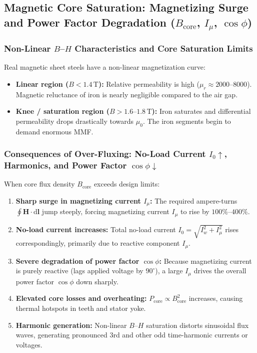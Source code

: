 \subsection{Magnetic Core Saturation: Magnetizing Surge and Power Factor Degradation ($B_{\mathrm{core}}$, $I_\mu$, $\cos\phi$)}

\subsubsection{Non-Linear $B$--$H$ Characteristics and Core Saturation Limits}
Real magnetic sheet steels have a non-linear magnetization curve:
\begin{itemize}
  \item \textbf{Linear region ($B < 1.4\,\mathrm{T}$):} Relative permeability is high ($\mu_r \approx 2000\text{--}8000$). Magnetic reluctance of iron is nearly negligible compared to the air gap.
  \item \textbf{Knee / saturation region ($B > 1.6\text{--}1.8\,\mathrm{T}$):} Iron saturates and differential permeability drops drastically towards $\mu_0$. The iron segments begin to demand enormous MMF.
\end{itemize}

\subsubsection{Consequences of Over-Fluxing: No-Load Current $I_0 \uparrow$, Harmonics, and Power Factor $\cos\phi \downarrow$}
When core flux density $B_{\mathrm{core}}$ exceeds design limits:
\begin{enumerate}
  \item \textbf{Sharp surge in magnetizing current $I_\mu$:} The required ampere-turns $\oint \mathbf{H}\cdot\mathrm{d}\mathbf{l}$ jump steeply, forcing magnetizing current $I_\mu$ to rise by $100\%\text{--}400\%$.
  \item \textbf{No-load current increases:} Total no-load current $I_0 = \sqrt{I_w^2 + I_\mu^2}$ rises correspondingly, primarily due to reactive component $I_\mu$.
  \item \textbf{Severe degradation of power factor $\cos\phi$:} Because magnetizing current is purely reactive (lags applied voltage by $90^\circ$), a large $I_\mu$ drives the overall power factor $\cos\phi$ down sharply.
  \item \textbf{Elevated core losses and overheating:} $P_{\mathrm{core}} \propto B_{\mathrm{core}}^2$ increases, causing thermal hotspots in teeth and stator yoke.
  \item \textbf{Harmonic generation:} Non-linear $B$--$H$ saturation distorts sinusoidal flux waves, generating pronounced 3rd and other odd time-harmonic currents or voltages.
\end{enumerate}

